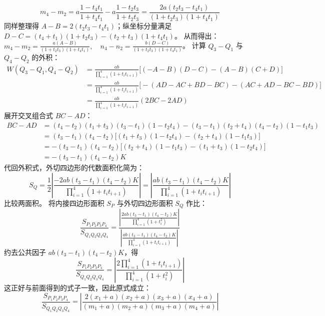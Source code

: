\begin{solution}
\[ m_4 - m_2 = a \frac{1-t_4 t_1}{1+t_4 t_1} - a \frac{1-t_2 t_3}{1+t_2 t_3} = \frac{2a(t_2 t_3 - t_4 t_1)}{(1+t_2 t_3)(1+t_4 t_1)} \]
同样整理得 $A-B = 2(t_2 t_3 - t_4 t_1)$；纵坐标分量满足 $D-C = (t_4+t_1)(1+t_2 t_3) - (t_2+t_3)(1+t_4 t_1)$。
从而得出：$m_4 - m_2 = \frac{a(A-B)}{(1+t_2t_3)(1+t_4t_1)}, \quad n_4 - n_2 = \frac{b(D-C)}{(1+t_2t_3)(1+t_4t_1)}$。
计算 $Q_3 - Q_1$ 与 $Q_4 - Q_2$ 的外积：
\begin{align*}
W(Q_3-Q_1, Q_4-Q_2) &= \frac{ab}{\prod_{i=1}^4 (1+t_i t_{i+1})} \Big[ (-A-B)(D-C) - (A-B)(C+D) \Big] \\
&= \frac{ab}{\prod_{i=1}^4 (1+t_i t_{i+1})} \big[ -(AD - AC + BD - BC) - (AC + AD - BC - BD) \big] \\
&= \frac{ab}{\prod_{i=1}^4 (1+t_i t_{i+1})} (2BC - 2AD)
\end{align*}
展开交叉组合式 $BC - AD$：
\begin{align*}
BC - AD &= (t_4-t_2)(t_1+t_3)(t_3-t_1)(1-t_2 t_4) - (t_3-t_1)(t_2+t_4)(t_4-t_2)(1-t_1 t_3) \\
&= (t_3-t_1)(t_4-t_2) \Big[ (t_1+t_3)(1-t_2 t_4) - (t_2+t_4)(1-t_1 t_3) \Big] \\
&= -(t_3-t_1)(t_4-t_2) \Big[ (t_2+t_4)(1-t_1 t_3) - (t_1+t_3)(1-t_2 t_4) \Big] \\
&= -(t_3-t_1)(t_4-t_2) K
\end{align*}
代回外积式，外切四边形的代数面积化简为：
\[ S_Q = \frac{1}{2} \left| \frac{-2ab (t_3-t_1)(t_4-t_2) K}{\prod_{i=1}^4 (1+t_i t_{i+1})} \right| = \left| \frac{ab (t_3-t_1)(t_4-t_2) K}{\prod_{i=1}^4 (1+t_i t_{i+1})} \right| \]
比较两面积。
将内接四边形面积 $S_P$ 与外切四边形面积 $S_Q$ 作比：
\[ \frac{S_{P_1P_2P_3P_4}}{S_{Q_1Q_2Q_3Q_4}} = \frac{ \left| \frac{2ab (t_3-t_1)(t_4-t_2) K}{\prod_{i=1}^4 (1+t_i^2)} \right| }{ \left| \frac{ab (t_3-t_1)(t_4-t_2) K}{\prod_{i=1}^4 (1+t_i t_{i+1})} \right| } \]
约去公共因子 $ab (t_3-t_1)(t_4-t_2) K$，得
\[ \frac{S_{P_1P_2P_3P_4}}{S_{Q_1Q_2Q_3Q_4}} = \left| \frac{2 \prod_{i=1}^4 (1+t_i t_{i+1})}{\prod_{i=1}^4 (1+t_i^2)} \right| \]
这正好与前面得到的式子一致，因此原式成立：
\[ \frac{S_{P_1P_2P_3P_4}}{S_{Q_1Q_2Q_3Q_4}} = \left| \frac{2(x_1 + a)(x_2 + a)(x_3 + a)(x_4 + a)}{(m_1 + a)(m_2 + a)(m_3 + a)(m_4 + a)} \right| \]
\end{solution}

